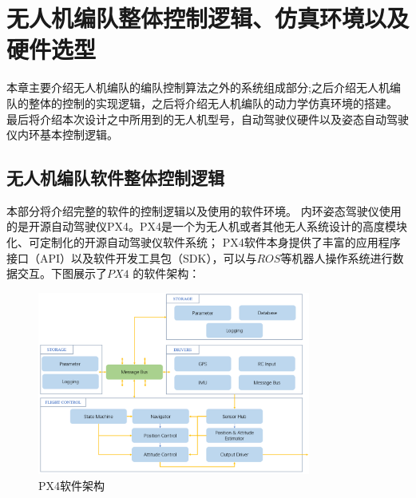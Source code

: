 %
%
%
%
%
%

\chapter{无人机编队整体控制逻辑、仿真环境以及硬件选型}
\label{chap:hardware}
本章主要介绍无人机编队的编队控制算法之外的系统组成部分;之后介绍无人机编队的整体的控制的实现逻辑，之后将介绍无人机编队的动力学仿真环境的搭建。
最后将介绍本次设计之中所用到的无人机型号，自动驾驶仪硬件以及姿态自动驾驶仪内环基本控制逻辑。
\section{无人机编队软件整体控制逻辑}
本部分将介绍完整的软件的控制逻辑以及使用的软件环境。
内环姿态驾驶仪使用的是开源自动驾驶仪PX4。PX4是一个为无人机或者其他无人系统设计的高度模块化、可定制化的开源自动驾驶仪软件系统；
PX4软件本身提供了丰富的应用程序接口（API）以及软件开发工具包（SDK），可以与$ROS$等机器人操作系统进行数据交互。下图展示了$PX4$
的软件架构：
\begin{figure}[H]
    \centering
    \includegraphics[width=0.8\textwidth]{figures/c4/PX4_archticher.png}
    \caption{PX4软件架构}\label{fig:PX4_archticher.png}
\end{figure}

